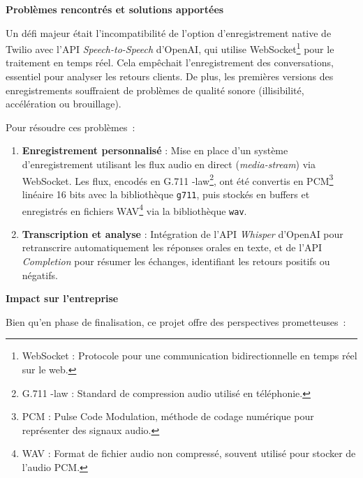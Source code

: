\textbf{Problèmes rencontrés et solutions apportées}\vspace{0.3cm}

Un défi majeur était l’incompatibilité de l’option d’enregistrement native de Twilio avec l’API \textit{Speech-to-Speech} d’OpenAI, qui utilise WebSocket\footnote{WebSocket : Protocole pour une communication bidirectionnelle en temps réel sur le web.}
 pour le traitement en temps réel. Cela empêchait l’enregistrement des conversations, essentiel pour analyser les retours clients. De plus, les premières versions des enregistrements souffraient de problèmes de qualité sonore (illisibilité, accélération ou brouillage).\vspace{0.3cm}

Pour résoudre ces problèmes~:

\begin{enumerate}
    \item \textbf{Enregistrement personnalisé} : Mise en place d’un système d’enregistrement utilisant les flux audio en direct (\textit{media-stream}) via WebSocket. Les flux, encodés en G.711 \textmu-law\footnote{G.711 \textmu-law : Standard de compression audio utilisé en téléphonie.}, ont été convertis en PCM\footnote{PCM : Pulse Code Modulation, méthode de codage numérique pour représenter des signaux audio.}
 linéaire 16 bits avec la bibliothèque \texttt{g711}, puis stockés en buffers et enregistrés en fichiers WAV\footnote{WAV : Format de fichier audio non compressé, souvent utilisé pour stocker de l’audio PCM.}
 via la bibliothèque \texttt{wav}.\vspace{0.3cm}
    \item \textbf{Transcription et analyse} : Intégration de l’API \textit{Whisper} d’OpenAI pour retranscrire automatiquement les réponses orales en texte, et de l’API \textit{Completion} pour résumer les échanges, identifiant les retours positifs ou négatifs.\vspace{0.3cm}
\end{enumerate}

\textbf{Impact sur l’entreprise}\vspace{0.3cm}

Bien qu’en phase de finalisation, ce projet offre des perspectives prometteuses~:


